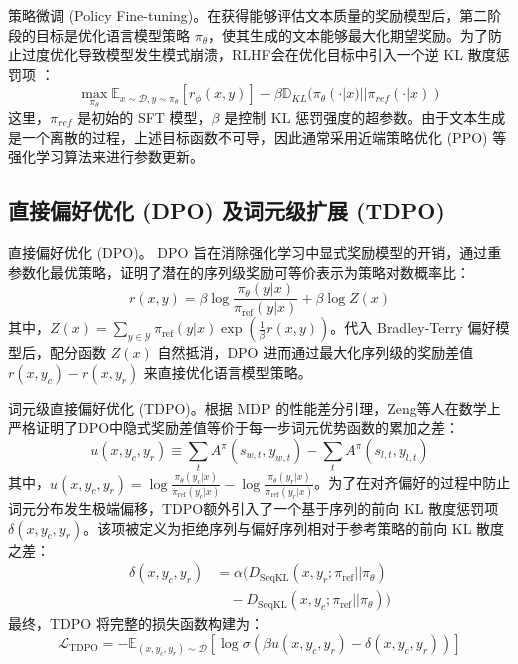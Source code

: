 \documentclass[lettersize,journal]{IEEEtran}
\begin{document}
策略微调 (Policy Fine-tuning)。在获得能够评估文本质量的奖励模型后，第二阶段的目标是优化语言模型策略 $\pi_\theta$，使其生成的文本能够最大化期望奖励。为了防止过度优化导致模型发生模式崩溃，RLHF会在优化目标中引入一个逆 KL 散度惩罚项 ：
\begin{equation}
    \max_{\pi_\theta} \mathbb{E}_{x \sim \mathcal{D}, y \sim \pi_\theta}[r_\phi(x, y)] - \beta \mathbb{D}_{KL}(\pi_\theta(\cdot|x) || \pi_{ref}(\cdot|x))
\end{equation}
这里，$\pi_{ref}$ 是初始的 SFT 模型，$\beta$ 是控制 KL 惩罚强度的超参数。由于文本生成是一个离散的过程，上述目标函数不可导，因此通常采用近端策略优化 (PPO) 等强化学习算法来进行参数更新。
\subsection{直接偏好优化 (DPO) 及词元级扩展 (TDPO)}\label{sec:prelim}
直接偏好优化 (DPO)\cite{rafailov2023direct}。 DPO 旨在消除强化学习中显式奖励模型的开销，通过重参数化最优策略，证明了潜在的序列级奖励可等价表示为策略对数概率比：
\begin{equation}
    r(x, y) = \beta \log \frac{\pi_\theta(y|x)}{\pi_{\text{ref}}(y|x)} + \beta \log Z(x)
\end{equation}
其中，$Z(x) = \sum_{y \in \mathcal{Y}} \pi_{\text{ref}}(y|x) \exp\left(\frac{1}{\beta} r(x, y)\right)$。代入 Bradley-Terry 偏好模型后，配分函数 $Z(x)$ 自然抵消，DPO 进而通过最大化序列级的奖励差值 $r(x, y_c) - r(x, y_r)$ 来直接优化语言模型策略。

词元级直接偏好优化 (TDPO)\cite{zeng2024token}。根据 MDP 的性能差分引理，Zeng等人在数学上严格证明了DPO中隐式奖励差值等价于每一步词元优势函数的累加之差：
\begin{equation}
    u(x, y_c, y_r) \equiv \sum_{t} A^\pi(s_{w,t}, y_{w,t}) - \sum_{t} A^\pi(s_{l,t}, y_{l,t})
\end{equation}
其中，$u(x, y_c, y_r) =  \log \frac{\pi_\theta(y_c|x)}{\pi_{\text{ref}}(y_c|x)} -  \log \frac{\pi_\theta(y_r|x)}{\pi_{\text{ref}}(y_r|x)}$。为了在对齐偏好的过程中防止词元分布发生极端偏移，TDPO额外引入了一个基于序列的前向 KL 散度惩罚项 $\delta(x, y_c, y_r)$。该项被定义为拒绝序列与偏好序列相对于参考策略的前向 KL 散度之差：
\begin{equation}
\begin{aligned}
\delta(x, y_c, y_r) &= \alpha \big( D_{\text{SeqKL}}(x, y_r; \pi_{\text{ref}} || \pi_\theta) \\
&\quad - D_{\text{SeqKL}}(x, y_c; \pi_{\text{ref}} || \pi_\theta) \big)
\end{aligned}
\end{equation}
最终，TDPO 将完整的损失函数构建为：
\begin{equation}
    \mathcal{L}_{\text{TDPO}} = -\mathbb{E}_{(x, y_c, y_r) \sim \mathcal{D}} \left[ \log \sigma \left(\beta u(x, y_c, y_r) - \delta(x, y_c, y_r) \right) \right]
\end{equation}
\end{document}
